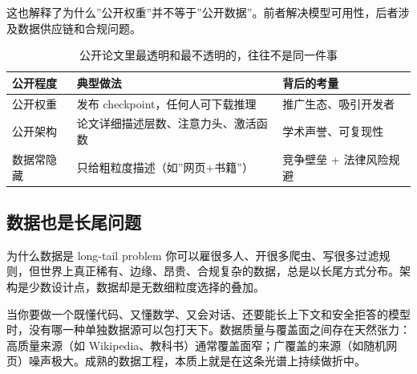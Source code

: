 这也解释了为什么”公开权重”并不等于”公开数据”。前者解决模型可用性，后者涉及数据供应链和合规问题。

\begin{table}[H]
\centering
\begin{tabular}{p{}p{}p{}}
\toprule
\textbf{公开程度} & \textbf{典型做法} & \textbf{背后的考量} \\
\midrule
公开权重 & 发布 checkpoint，任何人可下载推理 & 推广生态、吸引开发者 \\
公开架构 & 论文详细描述层数、注意力头、激活函数 & 学术声誉、可复现性 \\
数据常隐藏 & 只给粗粒度描述（如”网页+书籍”） & 竞争壁垒 + 法律风险规避 \\
\bottomrule
\end{tabular}
\caption{公开论文里最透明和最不透明的，往往不是同一件事}
\end{table}

\subsection{数据也是长尾问题}

\begin{knowledgebox}{为什么数据是 long-tail problem}
你可以雇很多人、开很多爬虫、写很多过滤规则，但世界上真正稀有、边缘、昂贵、合规复杂的数据，总是以长尾方式分布。架构是少数设计点，数据却是无数细粒度选择的叠加。
\end{knowledgebox}

当你要做一个既懂代码、又懂数学、又会对话、还要能长上下文和安全拒答的模型时，没有哪一种单独数据源可以包打天下。数据质量与覆盖面之间存在天然张力：高质量来源（如 Wikipedia、教科书）通常覆盖面窄；广覆盖的来源（如随机网页）噪声极大。成熟的数据工程，本质上就是在这条光谱上持续做折中。

